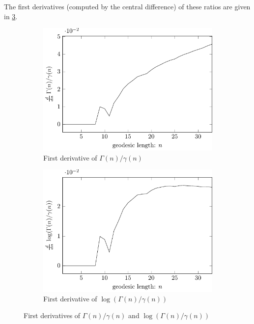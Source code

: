 The first derivatives (computed by the central difference) of these ratios are given in \cref{fig:normalGrowthRatioD1}.

\begin{figure}[!h]
	\centering
	
	\begin{subfigure}{0.48\linewidth}
		\centering
		\includegraphics[width=\linewidth]
			{figures/results/normalGrowth/usual/normalGrowthRatioD1}
		\caption{First derivative of $\Gamma(n)/\gamma(n)$}
		\label{fig:normalGrowthRatio:linear:D1}
	\end{subfigure}
	\hfill
	\begin{subfigure}{0.48\linewidth}
		\centering
		\includegraphics[width=\linewidth]
			{figures/results/normalGrowth/log/normalGrowthRatioLogD1}
		\caption{First derivative of $\log(\Gamma(n)/\gamma(n))$}
		\label{fig:normalGrowthRatio:log:D1}
	\end{subfigure}
	
	\caption{First derivatives of $\Gamma(n)/\gamma(n)$ and $\log(\Gamma(n)/\gamma(n))$}
	\label{fig:normalGrowthRatioD1}
\end{figure}

